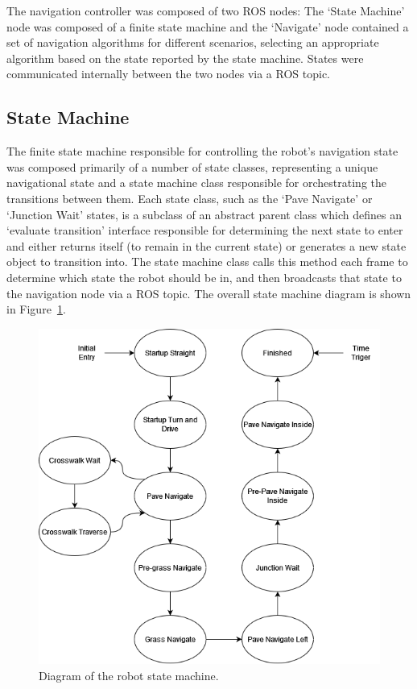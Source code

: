 \documentclass[titlepage, twocolumn]{article}
\begin{document}
    The navigation controller was composed of two ROS nodes: The `State Machine' node was composed of a finite state machine and the `Navigate' node contained a set of navigation algorithms for different scenarios, selecting an appropriate algorithm based on the state reported by the state machine. States were communicated internally between the two nodes via a ROS topic.
    
    \subsection{State Machine}
        The finite state machine responsible for controlling the robot's navigation state was composed primarily of a number of state classes, representing a unique navigational state and a state machine class responsible for orchestrating the transitions between them. Each state class, such as the `Pave Navigate' or `Junction Wait' states, is a subclass of an abstract parent class which defines an `evaluate transition' interface responsible for determining the next state to enter and either returns itself (to remain in the current state) or generates a new state object to transition into. The state machine class calls this method each frame to determine which state the robot should be in, and then broadcasts that state to the navigation node via a ROS topic. The overall state machine diagram is shown in Figure~\ref{fig:statemachine}.

        \begin{figure}
            \includegraphics[width=\linewidth]{statemachine.png}
            \caption{Diagram of the robot state machine.}
            \label{fig:statemachine}
        \end{figure}
\end{document}
